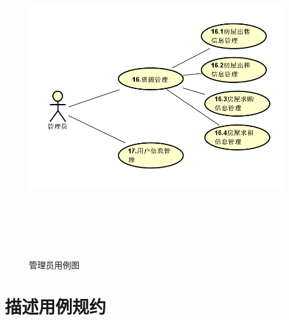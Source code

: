 \begin{figure}[htbp]

    \centering
    
    \includegraphics[height=14.0cm,width=14.0cm]{requirement/figures/guanliyuan.png} 
    \caption{管理员用例图}
    
    \end{figure}
    \newpage

\section{描述用例规约}


